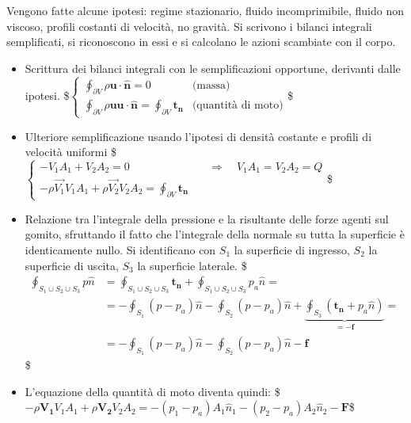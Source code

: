 \documentclass[letterpaper,10pt,italian]{jupyterBook}
\begin{document}
\sphinxAtStartPar
Vengono fatte alcune ipotesi: regime stazionario, fluido incomprimibile,
fluido non viscoso, profili costanti di velocità, no gravità. Si
scrivono i bilanci integrali semplificati, si riconoscono in essi e si
calcolano le azioni scambiate con il corpo.
\begin{itemize}
\item {} 
\sphinxAtStartPar
Scrittura dei bilanci integrali con le semplificazioni opportune,
derivanti dalle ipotesi. \$\(\begin{cases}
      \oint_{\partial V} \rho \bm{u} \cdot \hat{\bm{n}} = 0  & \text{(massa)} \\
      \oint_{\partial V} \rho \bm{u} \bm{u} \cdot \hat{\bm{n}} = \oint_{\partial V} \bm{t_n} & \text{(quantità di moto)}
     \end{cases}\)\$

\item {} 
\sphinxAtStartPar
Ulteriore semplificazione usando l’ipotesi di densità costante e
profili di velocità uniformi \$\(\begin{cases}
      -V_1 A_1 + V_2 A_2 = 0  & \quad \Rightarrow \quad V_1 A_1 = V_2 A_2 = Q \\
      - \rho \vec{V_1} V_1 A_1 + \rho \vec{V_2} V_2 A_2 = \oint_{\partial V} \bm{t_n}
     \end{cases}\)\$

\item {} 
\sphinxAtStartPar
Relazione tra l’integrale della pressione e la risultante delle
forze agenti sul gomito, sfruttando il fatto che l’integrale della
normale su tutta la superficie è identicamente nullo. Si
identificano con \(S_1\) la superficie di ingresso, \(S_2\) la
superficie di uscita, \(S_3\) la superficie laterale.
\$\(\begin{aligned}
      \displaystyle\oint_{S_1\cup S_2\cup S_3} p \hat{n} & =  \displaystyle\oint_{S_1\cup S_2\cup S_3} \bm{t_n} + \displaystyle\oint_{S_1\cup S_2\cup S_3} p_a \hat{n} = \\
      & = -\oint_{S_1} (p-p_a) \hat{n} - \oint_{S_2} (p-p_a) \hat{n} + \underbrace{\oint_{S_3} (\bm{t_n}+p_a\hat{n})}_{=-\bm{f}}  =  \\
      & = -\oint_{S_1} (p-p_a) \hat{n} - \oint_{S_2} (p-p_a) \hat{n} - \bm{f}
     \end{aligned}\)\$

\item {} 
\sphinxAtStartPar
L’equazione della quantità di moto diventa quindi:
\$\(- \rho \bm{V_1} V_1 A_1 + \rho \bm{V_2} V_2 A_2 = - (p_1 - p_a) A_1 \hat{n}_1 - (p_2 - p_a) A_2 \hat{n}_2 - \bm{F}\)\$


\end{itemize}
\end{document}
